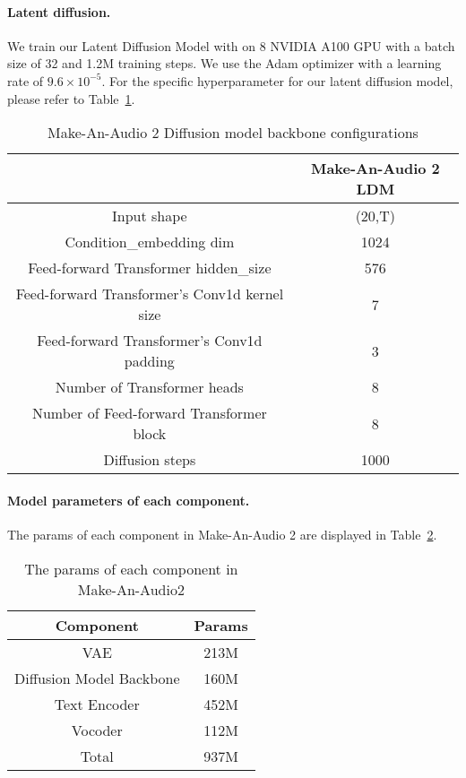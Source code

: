 \documentclass{article}
\begin{document}
\paragraph{Latent diffusion.}
We train our Latent Diffusion Model with on 8 NVIDIA A100 GPU with a batch size of 32 and 1.2M training steps. We use the Adam optimizer with a learning rate of $9.6\times 10^{-5}$. For the specific hyperparameter for our latent diffusion model, please refer to Table~\ref{tab:LDM_config}.

\begin{table}[htbp]
  \centering
    \begin{tabular}{c|c}
    \toprule
           & Make-An-Audio 2 LDM \\
    \midrule 
    Input shape & (20,T) \\
    Condition\_embedding dim & 1024 \\
    Feed-forward Transformer hidden\_size & 576 \\
    Feed-forward Transformer's Conv1d kernel size & 7 \\
    Feed-forward Transformer's Conv1d padding & 3 \\
    Number of Transformer heads & 8 \\
    Number of Feed-forward Transformer block & 8 \\
    Diffusion steps & 1000 \\
    \bottomrule
    \end{tabular}\vspace{5pt}
  \caption{Make-An-Audio 2 Diffusion model backbone configurations}
  \label{tab:LDM_config}\end{table}

\paragraph{Model parameters of each component.}
The params of each component in Make-An-Audio 2 are displayed in Table~\ref{tab:component_param}.

\begin{table}[htbp]
  \centering
    \begin{tabular}{cc}
    \toprule
    Component & Params \\
    \midrule 
    VAE    & 213M \\
    Diffusion Model Backbone & 160M \\
    Text Encoder & 452M \\
    Vocoder & 112M \\
    \midrule 
    Total  & 937M \\
    \bottomrule
    \end{tabular}\vspace{5pt}
  \caption{The params of each component in Make-An-Audio2}
  \label{tab:component_param}\end{table}
\end{document}
